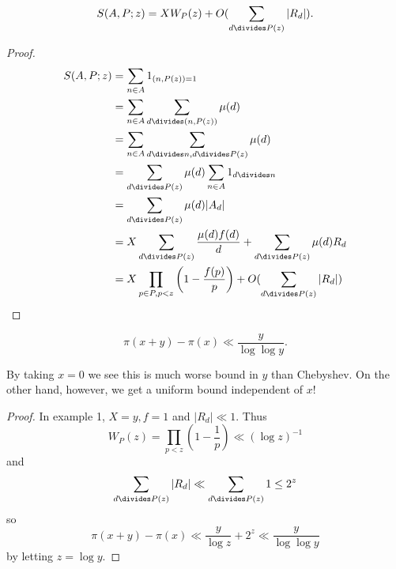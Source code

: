 \documentclass[a4paper]{article}
\begin{document}
\begin{theorem}
  \[
    S(A, P; z) = XW_P(z) + O(\sum_{d \divides P(z)} |R_d|).
  \]
\end{theorem}

\begin{proof}
  \begin{align*}
    S(A, P; z)
    &= \sum_{n \in A} 1_{(n, P(z)) = 1} \\
    &= \sum_{n \in A} \sum_{d \divides (n, P(z))} \mu(d) \\
    &= \sum_{n \in A} \sum_{d \divides n, d \divides P(z)} \mu(d) \\
    &= \sum_{d \divides P(z)} \mu(d) \sum_{n \in A} 1_{d \divides n} \\
    &= \sum_{d \divides P(z)} \mu(d) |A_d| \\
    &= X \sum_{d \divides P(z)} \frac{\mu(d) f(d)}{d} + \sum_{d \divides P(z)} \mu(d) R_d \\
    &= X \prod_{p \in P, p < z} \left(1 - \frac{f(p)}{p} \right) + O(\sum_{d \divides P(z)} |R_d|)
  \end{align*}
\end{proof}

\begin{corollary}
  \[
    \pi(x + y) - \pi(x) \ll \frac{y}{\log \log y}.
  \]
\end{corollary}
By taking \(x = 0\) we see this is much worse bound in \(y\) than Chebyshev. On the other hand, however, we get a uniform bound independent of \(x\)!

\begin{proof}
  In example 1, \(X = y, f = 1\) and \(|R_d| \ll 1\). Thus
  \[
    W_P(z)
    = \prod_{p < z} \left( 1 - \frac{1}{p} \right)
    \ll (\log z)^{-1}
  \]
  and
  \[
    \sum_{d \divides P(z)} |R_d| \ll \sum_{d \divides P(z)} 1 \leq 2^z
  \]
  so
  \[
    \pi(x + y) - \pi(x) \ll \frac{y}{\log z} + 2^z \ll \frac{y}{\log \log y}
  \]
  by letting \(z = \log y\).
\end{proof}









\printindex
\end{document}
